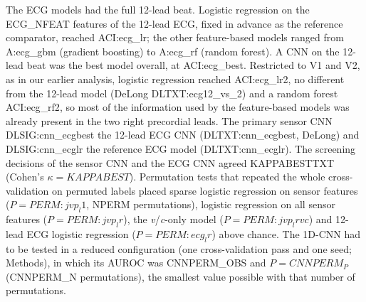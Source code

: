 \documentclass[11pt]{article}
\begin{document}
The ECG models had the full 12-lead beat. Logistic regression on the {{ECG_NFEAT}} features of the 12-lead ECG, fixed in advance as the reference comparator, reached {{ACI:ecg_lr}}; the other feature-based models ranged from {{A:ecg_gbm}} (gradient boosting) to {{A:ecg_rf}} (random forest). A CNN on the 12-lead beat was the best model overall, at {{ACI:ecg_best}}. Restricted to V1 and V2, as in our earlier analysis, logistic regression reached {{ACI:ecg_lr2}}, no different from the 12-lead model (DeLong {{DLTXT:ecg12_vs_2}}) and a random forest {{ACI:ecg_rf2}}, so most of the information used by the feature-based models was already present in the two right precordial leads. The primary sensor CNN {{DLSIG:cnn_ecgbest}} the 12-lead ECG CNN ({{DLTXT:cnn_ecgbest}}, DeLong) and {{DLSIG:cnn_ecglr}} the reference ECG model ({{DLTXT:cnn_ecglr}}). The screening decisions of the sensor CNN and the ECG CNN agreed {{KAPPABESTTXT}} (Cohen's $\kappa={{KAPPABEST}}$). Permutation tests that repeated the whole cross-validation on permuted labels placed sparse logistic regression on sensor features ($P={{PERM:jvp_l1}}$, {{NPERM}} permutations), logistic regression on all sensor features ($P={{PERM:jvp_lr}}$), the \textit{v}/\textit{c}-only model ($P={{PERM:jvp_lrvc}}$) and 12-lead ECG logistic regression ($P={{PERM:ecg_lr}}$) above chance. The 1D-CNN had to be tested in a reduced configuration (one cross-validation pass and one seed; Methods), in which its AUROC was {{CNNPERM_OBS}} and $P={{CNNPERM_P}}$ ({{CNNPERM_N}} permutations), the smallest value possible with that number of permutations.

\begin{table}[t]
\centering\footnotesize
\caption{\textbf{Subject-level cross-validated performance} ({{N}} participants, {{NPOS}} diseased; prevalence {{PREV}}). AUROC and AUPRC are means over cross-validation repeats with 95\% stratified participant-bootstrap CIs. Sensitivity, specificity, balanced accuracy and the Matthews correlation coefficient (MCC) use thresholds chosen inside each training fold (0.5 for the CNNs and ROCKET); a random classifier has an AUPRC equal to the prevalence. LR, logistic regression; L1-LR, sparse logistic regression; SVM, support vector machine; RF, random forest; GBM, gradient boosting; CNN, convolutional neural network.}
\label{tab:bench}
\end{table}
\end{document}
